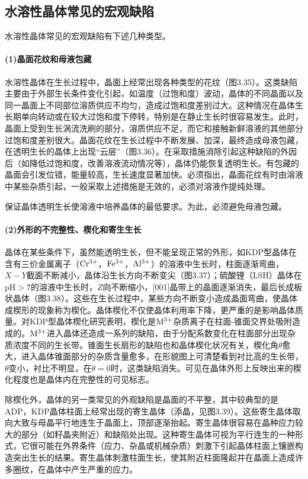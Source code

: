 ﻿\subsection{水溶性晶体常见的宏观缺陷}
水溶性晶体常见的宏观缺陷有下述几种类型。

\paragraph{(1)晶面花纹和母液包藏}水溶性晶体在生长过程中，晶面上经常出现各种类型的花纹（图3.35）。这类缺陷主要由于外部生长条件变化引起，如温度（过饱和度）波动，晶体的不同晶面以及同一晶面上不同部位溶质供应不均匀，造成过饱和度差别过大。这种情况在晶体生长期单向转动或在较大过饱和度下停转，特别是在静止生长时很容易发生。此时，晶面上受到生长涡流洗刷的部分，溶质供应不足，而它和接触新鲜溶液的其他部分过饱和度差别很大。晶面花纹在生长过程中不断发展、加深，最终造成母液包藏，在透明生长的晶体上出现“云层”（图3.36）。在采取措施消除引起这种缺陷的外因后（如降低过饱和度，改善溶液流动情况等），晶体仍能恢复透明生长。有包藏的晶面会引发位错，能量较高，生长速度显著加快。必须指出，晶面花纹有时由溶液中某些杂质引起，一般采取上述措施是无效的，必须对溶液作提纯处理。

保证晶体透明生长使溶液中培养晶体的最低要求。为此，必须避免母液包藏。

\paragraph{(2)外形的不完整性、楔化和寄生生长}晶体在某些条件下，虽然能透明生长，但不能呈现正常的外形，如KDP型晶体在含有三价金属离子（$\rm Cr^{3+}$，$\rm Fe^{3+}$，$\rm Al^{3+}$）的溶液中生长时，柱面逐渐弯曲，$X-Y$截面不断减小，晶体沿生长方向不断变尖（图3.37）；硫酸锂（LSH）晶体在$\text{pH}>7$的溶液中生长时，$Z$向不断缩小，[001]晶带上的晶面逐渐消失，最后长成板状晶体（图3.38）。这些在生长过程中，某些方向不断变小造成晶面弯曲，使晶体成楔形的现象称为楔化。晶体楔化不仅使晶体利用率下降，更严重的是影响晶体质量。对KDP型晶体楔化研究表明，楔化是$\rm M^{3+}$杂质离子在柱面-锥面交界处吸附造成的。$\rm M^{3+}$进入晶体还造成一系列的缺陷，由于分配系数变化在柱面部分出现杂质浓度不同的生长带。锥面生长扇形的缺陷也和晶体楔化状况有关，楔化角$\theta$愈大，进入晶体锥面部分的杂质含量愈多，在形貌图上可清楚看到衬比高的生长带，$\theta$变小，衬比不明显，在$\theta=0$时，这类缺陷消失。可见在晶体外形上反映出来的楔化程度也是晶体内在完整性的可见标志。

除楔化外，晶体的另一类常见的外观缺陷是晶面的不平整，其中较典型的是ADP，KDP晶体柱面上经常出现的寄生晶体（添晶，见图3.39）。这些寄生晶体取向大致与母晶平行地连生于晶面上，顶部逐渐抬起。寄生晶体很容易在晶种应力较大的部分（如籽晶夹附近）和缺陷处出现。这种寄生晶体可视为平行连生的一种形式，它很可能在外界条件（应力、杂晶或机械杂质）刺激下引起晶体柱面上镶嵌构造突出生长的结果。寄生晶体刺激柱面生长，使其附近柱面隆起并在晶面上造成许多圈纹，在晶体中产生严重的应力。

